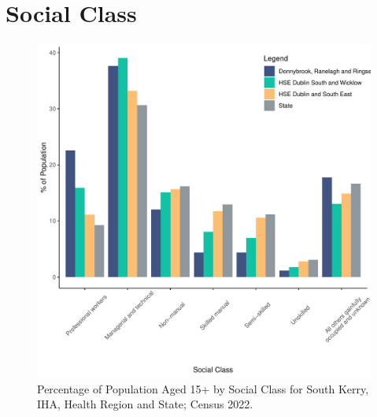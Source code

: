 \documentclass{article}
\begin{document}
\section{Social Class}\label{sect:SC}
\begin{figure}[H]
	\centering
	\includegraphics[width = 140mm]{../figures/SocialClassED.pdf}
	\caption{Percentage of Population Aged 15+ by Social Class for South Kerry, IHA, Health Region and State; Census 2022.}
	\label{fig:vbnv}
	\end{figure}
\end{document}
